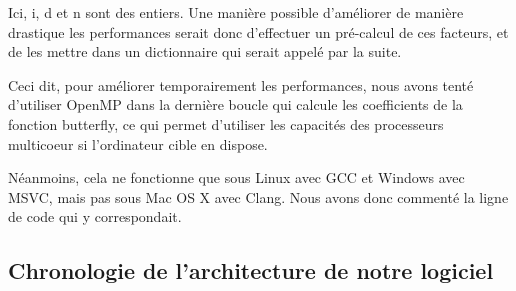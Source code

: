 Ici, i, d et n sont des entiers. Une manière possible d'améliorer de manière drastique les performances serait donc d'effectuer
un pré-calcul de ces facteurs, et de les mettre dans un dictionnaire qui serait appelé par la suite.

Ceci dit, pour améliorer temporairement les performances, nous avons tenté d'utiliser OpenMP dans la dernière boucle qui calcule
les coefficients de la fonction butterfly, ce qui permet d'utiliser les capacités des processeurs multicoeur si l'ordinateur cible en dispose.

Néanmoins, cela ne fonctionne que sous Linux avec \ac{GCC} et Windows avec \ac{MSVC}, mais pas sous Mac OS X avec Clang. Nous avons donc commenté la ligne de code qui y correspondait.

\subsection{Chronologie de l'architecture de notre logiciel}

